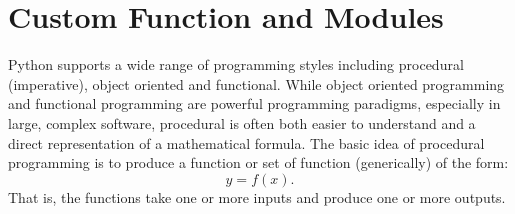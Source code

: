 \documentclass[KSmain.tex]{subfiles}
\begin{document}
 



\section{Custom Function and Modules}
Python supports a wide range of programming styles including procedural (imperative), object oriented
and functional. While object oriented programming and functional programming are powerful programming
paradigms, especially in large, complex software, procedural is often both easier to understand and a
direct representation of a mathematical formula. The basic idea of procedural programming is to produce
a function or set of function (generically) of the form:
\[ y = f (x ).\]
That is, the functions take one or more inputs and produce one or more outputs.

\end{document}
